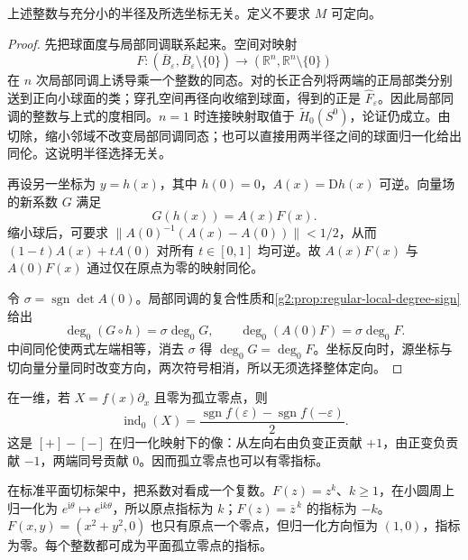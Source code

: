 \begin{proposition}\label{g2:prop:vector-index-well-defined}
	上述整数与充分小的半径及所选坐标无关。定义不要求 \(M\) 可定向。
\end{proposition}
\begin{proof}
	先把球面度与局部同调联系起来。空间对映射
	\[
		F:(\overline B_\varepsilon,\overline B_\varepsilon\setminus\{0\})
		\longrightarrow(\mathbb R^n,\mathbb R^n\setminus\{0\})
	\]
	在 \(n\) 次局部同调上诱导乘一个整数的同态。对的长正合列将两端的正局部类分别送到正向小球面的类；穿孔空间再径向收缩到球面，得到的正是 \(\widehat F_\varepsilon\)。因此局部同调的整数与上式的度相同。\(n=1\) 时连接映射取值于 \(\widetilde H_0(S^0)\)，论证仍成立。由切除，缩小邻域不改变局部同调同态；也可以直接用两半径之间的球面归一化给出同伦。这说明半径选择无关。

	再设另一坐标为 \(y=h(x)\)，其中 \(h(0)=0\)，\(A(x)=\mathrm Dh(x)\) 可逆。向量场的新系数 \(G\) 满足
	\[
		G(h(x))=A(x)F(x).
	\]
	缩小球后，可要求 \(\|A(0)^{-1}(A(x)-A(0))\|<1/2\)，从而 \((1-t)A(x)+tA(0)\) 对所有 \(t\in[0,1]\) 均可逆。故 \(A(x)F(x)\) 与 \(A(0)F(x)\) 通过仅在原点为零的映射同伦。

	令 \(\sigma=\operatorname{sgn}\det A(0)\)。局部同调的复合性质和\cref{g2:prop:regular-local-degree-sign}给出
	\[
		\deg_0(G\circ h)=\sigma\deg_0G,\qquad
		\deg_0(A(0)F)=\sigma\deg_0F.
	\]
	中间同伦使两式左端相等，消去 \(\sigma\) 得 \(\deg_0G=\deg_0F\)。坐标反向时，源坐标与切向量分量同时改变方向，两次符号相消，所以无须选择整体定向。
\end{proof}

在一维，若 \(X=f(x)\partial_x\) 且零为孤立零点，则
\begin{equation}\label{g2:eq:one-dimensional-vector-index}
	\operatorname{ind}_0(X)
	=\frac{\operatorname{sgn}f(\varepsilon)-\operatorname{sgn}f(-\varepsilon)}2.
\end{equation}
这是 \([+]-[-]\) 在归一化映射下的像：从左向右由负变正贡献 \(+1\)，由正变负贡献 \(-1\)，两端同号贡献 \(0\)。因而孤立零点也可以有零指标。

\begin{example}\label{g2:exm:planar-index-windings}
	在标准平面切标架中，把系数对看成一个复数。\(F(z)=z^k\)、\(k\ge1\)，在小圆周上归一化为 \(e^{\mathrm i\theta}\mapsto e^{\mathrm i k\theta}\)，所以原点指标为 \(k\)；\(F(z)=\overline z^{\,k}\) 的指标为 \(-k\)。\(F(x,y)=(x^2+y^2,0)\) 也只有原点一个零点，但归一化方向恒为 \((1,0)\)，指标为零。每个整数都可成为平面孤立零点的指标。
\end{example}

